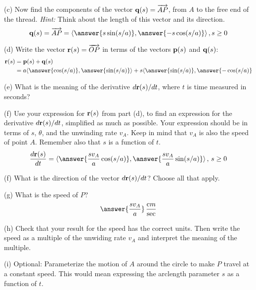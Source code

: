 \documentclass{ximera}
\begin{document}
\begin{question}
(c) Now find the components of the vector ${\bf q}(s) = \overrightarrow{AP}$, from $A$ to the free end of the thread. {\it Hint:} Think about the length of this vector and its direction.
\[
     {\bf q}(s) = \overrightarrow{AP} = \langle \answer{s \sin (s/a)} , \answer{-s \cos (s/a)}  \rangle \, , s\geq 0
\]

(d) Write the vector ${\bf r}(s) = \overrightarrow{OP}$ in terms of the vectors ${\bf p}(s)$ and ${\bf q}(s)$:
\begin{align*}
  {\bf r}(s)   &= {\bf p}(s) + {\bf q}(s)   \\
                  &= a \langle \answer{\cos (s/a)} , \answer{\sin (s/a)}  \rangle  +  s \langle \answer{\sin (s/a)} , \answer{-\cos (s/a)}
\end{align*}


(e) What is the meaning of the derivative $d{\bf r}(s)/dt$, where $t$ is time measured in seconds?
\begin{multipleChoice}  
\end{multipleChoice} 


(f) Use your expression for ${\bf r}(s)$ from part (d), to find an expression for the derivative $d{\bf r}(s)/dt$, simplified as much as possible. Your expression should be in terms of $s$, $\theta$, and the unwinding rate $v_A$. Keep in mind that $v_A$ is also the speed of point $A$. Remember also that $s$ is a function of $t$.
\[
      \frac{d{\bf r}(s)}{dt} = \langle  \answer{\frac{s v_A}{a} \cos(s/a)}  , \answer{\frac{sv_A}{a} \sin(s/a)}   \rangle \, , \, s\geq 0 
\]


(f) What is the direction of the vector $d{\bf r}(s)/dt$? Choose all that apply.
\begin{selectAll}  
  \end{selectAll} 


(g) What is the speed of $P$?
\[
   \answer{\frac{sv_A}{a}} \,    \frac{\text cm}{\text{sec}}
\]


(h) Check that your result for the speed has the correct units. Then write the speed as a multiple of the unwiding rate $v_A$ and interpret the meaning of the multiple.

(i) Optional: Parameterize the motion of $A$ around the circle to make $P$ travel at a constant speed. This would mean expressing the arclength parameter $s$ as a function of $t$.

\end{question}
\end{document}
